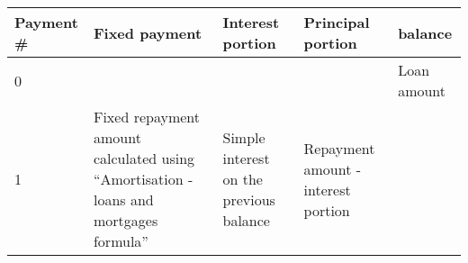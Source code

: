 \documentclass[]{book}
\theoremstyle{definition}
\theoremstyle{definition}
\theoremstyle{definition}
\theoremstyle{remark}
\begin{document}
\begin{longtable}[]{@{}lllll@{}}
\toprule
\begin{minipage}[b]{0.17\columnwidth}\raggedright\strut
Payment \#\strut
\end{minipage} & \begin{minipage}[b]{0.17\columnwidth}\raggedright\strut
Fixed payment\strut
\end{minipage} & \begin{minipage}[b]{0.17\columnwidth}\raggedright\strut
Interest portion\strut
\end{minipage} & \begin{minipage}[b]{0.17\columnwidth}\raggedright\strut
Principal portion\strut
\end{minipage} & \begin{minipage}[b]{0.17\columnwidth}\raggedright\strut
balance\strut
\end{minipage}\tabularnewline
\midrule
\endhead
\begin{minipage}[t]{0.17\columnwidth}\raggedright\strut
0\strut
\end{minipage} & \begin{minipage}[t]{0.17\columnwidth}\raggedright\strut
\strut
\end{minipage} & \begin{minipage}[t]{0.17\columnwidth}\raggedright\strut
\strut
\end{minipage} & \begin{minipage}[t]{0.17\columnwidth}\raggedright\strut
\strut
\end{minipage} & \begin{minipage}[t]{0.17\columnwidth}\raggedright\strut
Loan amount\strut
\end{minipage}\tabularnewline
\begin{minipage}[t]{0.17\columnwidth}\raggedright\strut
1\strut
\end{minipage} & \begin{minipage}[t]{0.17\columnwidth}\raggedright\strut
Fixed repayment amount calculated using ``Amortisation - loans and
mortgages formula''\strut
\end{minipage} & \begin{minipage}[t]{0.17\columnwidth}\raggedright\strut
Simple interest on the previous balance\strut
\end{minipage} & \begin{minipage}[t]{0.17\columnwidth}\raggedright\strut
Repayment amount - interest portion\strut
\end{minipage} & \begin{minipage}[t]{0.17\columnwidth}\raggedright\strut

\end{minipage}
\end{longtable}
\end{document}
